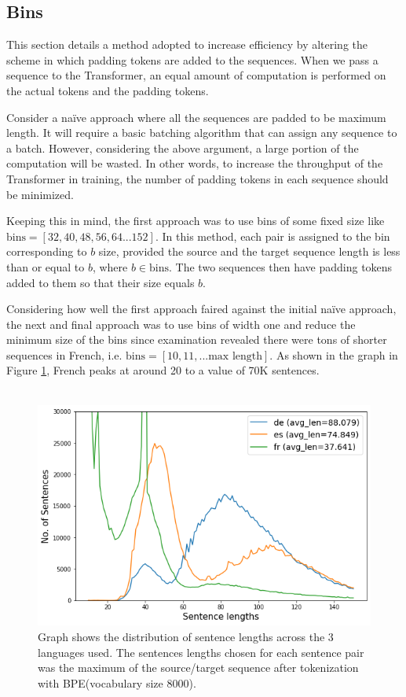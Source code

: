 \documentclass[12pt,a4paper,twoside,openright]{report}
\begin{document}
\subsection{Bins}
\label{bins}
This section details a method adopted to increase efficiency by altering the scheme in which padding tokens are added to the sequences. When we pass a sequence to the Transformer, an equal amount of computation is performed on the actual tokens and the padding tokens. 

Consider a na\"ive approach where all the sequences are padded to be maximum length. It will require a basic batching algorithm that can assign any sequence to a batch. However, considering the above argument, a large portion of the computation will be wasted. In other words, to increase the throughput of the Transformer in training, the number of padding tokens in each sequence should be minimized.  

Keeping this in mind, the first approach was to use bins of some fixed size like \\$\text{bins} = [32, 40, 48, 56, 64...152]$. In this method, each pair is assigned to the bin corresponding to $b$ size, provided the source and the target sequence length is less than or equal to $b$, where $b \in \text{bins}$. The two sequences then have padding tokens added to them so that their size equals $b$. 

Considering how well the first approach faired against the initial na\"ive approach, the next and final approach was to use bins of width one and reduce the minimum size of the bins since examination revealed there were tons of shorter sequences in French, i.e. $\text{bins} = [10, 11, ... \text{max length}]$. As shown in the graph in Figure \ref{fig:distribution-across-languages}, French peaks at around 20 to a value of 70K sentences. 
\\\\

\begin{figure}
    \centering
    \includegraphics[width=\textwidth*3/4]{figs/length-distribution-across-languages.png}
    \caption{Graph shows the distribution of sentence lengths across the 3 languages used. The sentences lengths chosen for each sentence pair was the maximum of the source/target sequence after tokenization with BPE(vocabulary size 8000).}
    \label{fig:distribution-across-languages}
\end{figure}
    
\end{document}
